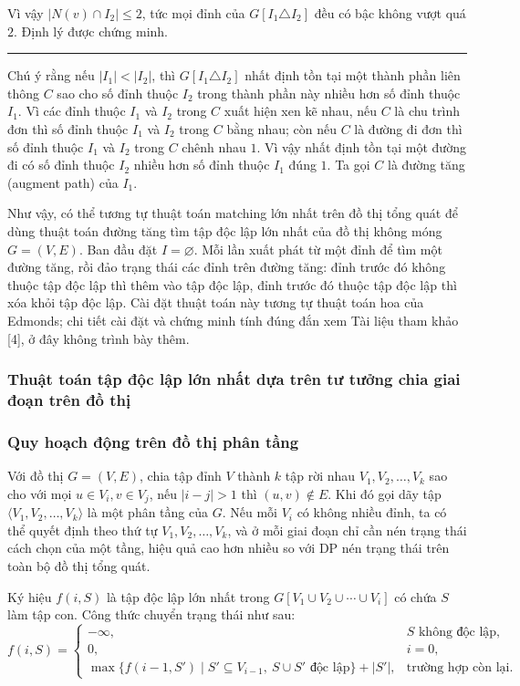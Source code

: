 \documentclass[11pt]{article}
\newcommand{\qedmark}{\hfill\rule{0.7ex}{0.7ex}}
\begin{document}
Vì vậy \(|N(v)\cap I_2|\le 2\), tức mọi đỉnh của \(G[I_1\triangle I_2]\) đều
có bậc không vượt quá \(2\). Định lý được chứng minh. \qedmark

Chú ý rằng nếu \(|I_1|<|I_2|\), thì \(G[I_1\triangle I_2]\) nhất định tồn tại
một thành phần liên thông \(C\) sao cho số đỉnh thuộc \(I_2\) trong thành phần
này nhiều hơn số đỉnh thuộc \(I_1\). Vì các đỉnh thuộc \(I_1\) và \(I_2\) trong
\(C\) xuất hiện xen kẽ nhau, nếu \(C\) là chu trình đơn thì số đỉnh thuộc
\(I_1\) và \(I_2\) trong \(C\) bằng nhau; còn nếu \(C\) là đường đi đơn thì số
đỉnh thuộc \(I_1\) và \(I_2\) trong \(C\) chênh nhau \(1\). Vì vậy nhất định
tồn tại một đường đi có số đỉnh thuộc \(I_2\) nhiều hơn số đỉnh thuộc \(I_1\)
đúng \(1\). Ta gọi \(C\) là đường tăng (augment path) của \(I_1\).

Như vậy, có thể tương tự thuật toán matching lớn nhất trên đồ thị tổng quát để
dùng thuật toán đường tăng tìm tập độc lập lớn nhất của đồ thị không móng
\(G=(V,E)\). Ban đầu đặt \(I=\varnothing\). Mỗi lần xuất phát từ một đỉnh để
tìm một đường tăng, rồi đảo trạng thái các đỉnh trên đường tăng: đỉnh trước đó
không thuộc tập độc lập thì thêm vào tập độc lập, đỉnh trước đó thuộc tập độc
lập thì xóa khỏi tập độc lập. Cài đặt thuật toán này tương tự thuật toán hoa
của Edmonds; chi tiết cài đặt và chứng minh tính đúng đắn xem Tài liệu tham
khảo [4], ở đây không trình bày thêm.

\subsubsection{Thuật toán tập độc lập lớn nhất dựa trên tư tưởng chia giai đoạn trên đồ thị}

\subsubsection{Quy hoạch động trên đồ thị phân tầng}

Với đồ thị \(G=(V,E)\), chia tập đỉnh \(V\) thành \(k\) tập rời nhau
\(V_1,V_2,\ldots,V_k\) sao cho với mọi \(u\in V_i,v\in V_j\), nếu
\(|i-j|>1\) thì \((u,v)\notin E\). Khi đó gọi dãy tập
\(\langle V_1,V_2,\ldots,V_k\rangle\) là một phân tầng của \(G\). Nếu mỗi
\(V_i\) có không nhiều đỉnh, ta có thể quyết định theo thứ tự
\(V_1,V_2,\ldots,V_k\), và ở mỗi giai đoạn chỉ cần nén trạng thái cách chọn của
một tầng, hiệu quả cao hơn nhiều so với DP nén trạng thái trên toàn bộ đồ thị
tổng quát.

Ký hiệu \(f(i,S)\) là tập độc lập lớn nhất trong
\(G[V_1\cup V_2\cup\cdots\cup V_i]\) có chứa \(S\) làm tập con. Công thức
chuyển trạng thái như sau:
\[
  f(i,S)=
  \begin{cases}
    -\infty, & S\text{ không độc lập},\\
    0, & i=0,\\
    \max\{f(i-1,S')\mid S'\subseteq V_{i-1},\ S\cup S'\text{ độc lập}\}
      + |S'|, & \text{trường hợp còn lại.}
  \end{cases}
\]
\end{document}
